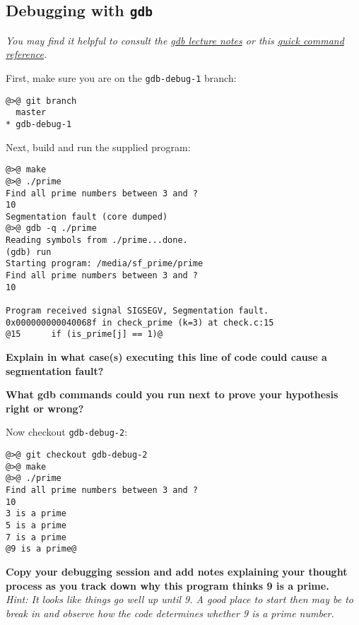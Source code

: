 \documentclass{article}
\begin{document}
\subsection{Debugging with \texttt{gdb}}

\emph{You may find it helpful to consult the
  \href{http://cse80.github.io/static/lecture/wk7-gdb.pdf}{gdb lecture notes}
  or this
  \href{https://ccrma.stanford.edu/~jos/stkintro/Useful_commands_gdb.html}
  {quick command reference}.
}



First, make sure you are on the \texttt{gdb-debug-1} branch:
\begin{lstlisting}
@>@ git branch
  master
* gdb-debug-1
\end{lstlisting}

Next, build and run the supplied program:
\begin{lstlisting}
@>@ make
@>@ ./prime
Find all prime numbers between 3 and ?
10
Segmentation fault (core dumped)
@>@ gdb -q ./prime
Reading symbols from ./prime...done.
(gdb) run
Starting program: /media/sf_prime/prime 
Find all prime numbers between 3 and ?
10

Program received signal SIGSEGV, Segmentation fault.
0x000000000040068f in check_prime (k=3) at check.c:15
@15      if (is_prime[j] == 1)@
\end{lstlisting}

\textbf{Explain in what case(s) executing this line of code could cause a
  segmentation fault?}
\vspace{3cm}

\textbf{What gdb commands could you run next to prove your hypothesis right or
  wrong?}
\vspace{3cm}


\newpage
Now checkout \texttt{gdb-debug-2}:
\begin{lstlisting}
@>@ git checkout gdb-debug-2
@>@ make
@>@ ./prime
Find all prime numbers between 3 and ?
10
3 is a prime
5 is a prime
7 is a prime
@9 is a prime@
\end{lstlisting}
\textbf{Copy your debugging session and add notes explaining your
  thought process as you track down why this program thinks 9 is a prime.}\\
\emph{\small Hint: It looks like things go well up until 9. A good place to
  start then may be to break in and observe how the code determines whether 9
  is a prime number.}
\end{document}
